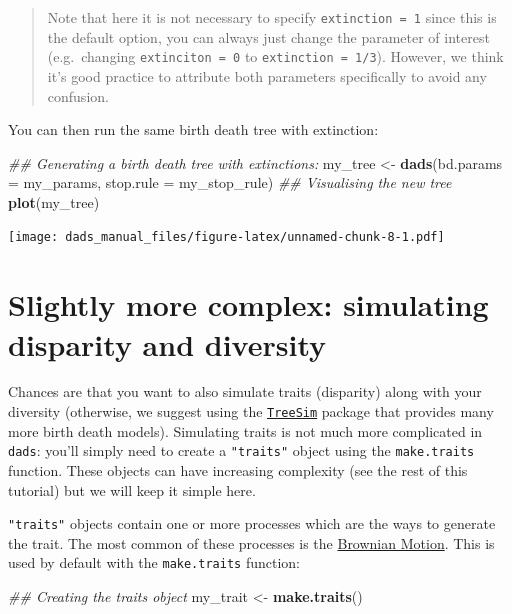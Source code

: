 \documentclass[]{book}
\newenvironment{Shaded}{\begin{snugshade}}{\end{snugshade}}
\newcommand{\CommentTok}[1]{\textcolor[rgb]{0.56,0.35,0.01}{\textit{#1}}}
\newcommand{\DataTypeTok}[1]{\textcolor[rgb]{0.13,0.29,0.53}{#1}}
\newcommand{\KeywordTok}[1]{\textcolor[rgb]{0.13,0.29,0.53}{\textbf{#1}}}
\newcommand{\NormalTok}[1]{#1}
\newcommand{\StringTok}[1]{\textcolor[rgb]{0.31,0.60,0.02}{#1}}
\begin{document}
\begin{quote}
Note that here it is not necessary to specify \texttt{extinction\ =\ 1} since this is the default option, you can always just change the parameter of interest (e.g.~changing \texttt{extinciton\ =\ 0} to \texttt{extinction\ =\ 1/3}). However, we think it's good practice to attribute both parameters specifically to avoid any confusion.
\end{quote}

You can then run the same birth death tree with extinction:

\begin{Shaded}
\begin{Highlighting}[]
\CommentTok{## Generating a birth death tree with extinctions:}
\NormalTok{my_tree <-}\StringTok{ }\KeywordTok{dads}\NormalTok{(}\DataTypeTok{bd.params =}\NormalTok{ my_params, }\DataTypeTok{stop.rule =}\NormalTok{ my_stop_rule)}
\CommentTok{## Visualising the new tree}
\KeywordTok{plot}\NormalTok{(my_tree)}
\end{Highlighting}
\end{Shaded}

\texttt{[image: dads\_manual\_files/figure-latex/unnamed-chunk-8-1.pdf]}

\hypertarget{slightly-more-complex-simulating-disparity-and-diversity}{%
\section{Slightly more complex: simulating disparity and diversity}\label{slightly-more-complex-simulating-disparity-and-diversity}}

Chances are that you want to also simulate traits (disparity) along with your diversity (otherwise, we suggest using the \href{https://github.com/tanja819/TreeSim/}{\texttt{TreeSim}} package that provides many more birth death models).
Simulating traits is not much more complicated in \texttt{dads}: you'll simply need to create a \texttt{"traits"} object using the \texttt{make.traits} function.
These objects can have increasing complexity (see the rest of this tutorial) but we will keep it simple here.

\texttt{"traits"} objects contain one or more processes which are the ways to generate the trait.
The most common of these processes is the \href{https://en.wikipedia.org/wiki/Brownian_motion}{Brownian Motion}.
This is used by default with the \texttt{make.traits} function:

\begin{Shaded}
\begin{Highlighting}[]
\CommentTok{## Creating the traits object}
\NormalTok{my_trait <-}\StringTok{ }\KeywordTok{make.traits}\NormalTok{()}
\end{Highlighting}
\end{Shaded}
\end{document}
